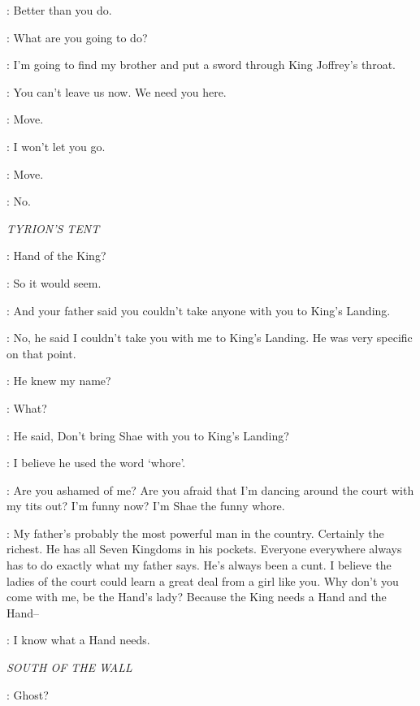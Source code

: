 \JON: Better than you do. 

\SAM: What are you going to do? 

\JON: I'm going to find my brother and put a sword through King Joffrey's throat. 

\SAM: You can't leave us now. We need you here. 

\JON: Move. 

\SAM: I won't let you go. 

\JON: Move. 

\SAM: No. 


\scene

\textit{TYRION'S TENT}


\SHAE: Hand of the King? 

\TYRION: So it would seem. 

\SHAE: And your father said you couldn't take anyone with you to King's Landing. 

\TYRION: No, he said I couldn't take you with me to King's Landing. He was very specific on that point. 

\SHAE: He knew my name? 

\TYRION: What? 

\SHAE: He said, Don't bring Shae with you to King's Landing? 

\TYRION: I believe he used the word `whore'. 

\SHAE: Are you ashamed of me? Are you afraid that I'm dancing around the court with my tits out? I'm funny now? I'm Shae the funny whore. 

\TYRION: My father's probably the most powerful man in the country. Certainly the richest. He has all Seven Kingdoms in his pockets. Everyone everywhere always has to do exactly what my father says. He's always been a cunt. I believe the ladies of the court could learn a great deal from a girl like you. Why don't you come with me, be the Hand's lady? Because the King needs a Hand and the Hand-- 

\SHAE: I know what a Hand needs. 


\scene

\textit{SOUTH OF THE WALL}


\JON: Ghost? 

